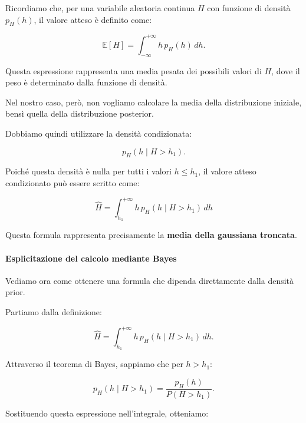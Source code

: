 Ricordiamo che, per una variabile aleatoria continua $H$ con funzione di densità $p_H(h)$, il valore atteso è definito come:

\begin{equation*}
    \mathbb{E}[H]
    =
    \int_{-\infty}^{+\infty}
    h\,p_H(h)\,dh.
\end{equation*}

Questa espressione rappresenta una media pesata dei possibili valori di $H$, dove il peso è determinato dalla funzione di densità.

Nel nostro caso, però, non vogliamo calcolare la media della distribuzione iniziale, bensì quella della distribuzione posterior.

Dobbiamo quindi utilizzare la densità condizionata:

\begin{equation*}
    p_H(h\mid H>h_1).
\end{equation*}

Poiché questa densità è nulla per tutti i valori $h\leq h_1$, il valore atteso condizionato può essere scritto come:

\begin{equation*}
    \boxed{
    \hat{H}
    =
    \int_{h_1}^{+\infty}
    h\,p_H(h\mid H>h_1)\,dh
    }
\end{equation*}

Questa formula rappresenta precisamente la \textbf{media della gaussiana troncata}.

\paragraph{Esplicitazione del calcolo mediante Bayes}

Vediamo ora come ottenere una formula che dipenda direttamente dalla densità prior.

Partiamo dalla definizione:

\begin{equation*}
    \hat{H}
    =
    \int_{h_1}^{+\infty}
    h\,p_H(h\mid H>h_1)\,dh.
\end{equation*}

Attraverso il teorema di Bayes, sappiamo che per $h>h_1$:

\begin{equation*}
    p_H(h\mid H>h_1)
    =
    \frac{p_H(h)}{P(H>h_1)}.
\end{equation*}

Sostituendo questa espressione nell'integrale, otteniamo:

